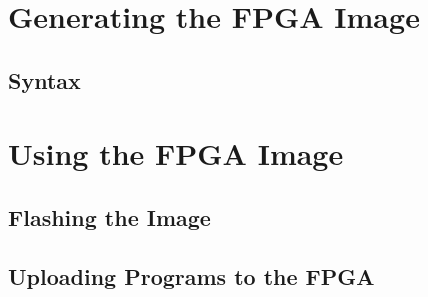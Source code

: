 \section{Generating the FPGA Image}
\subsection{Syntax}


\section{Using the FPGA Image}
\subsection{Flashing the Image}
\subsection{Uploading Programs to the FPGA}
